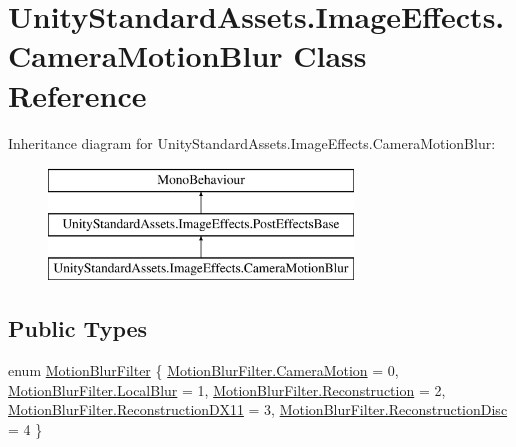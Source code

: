 \hypertarget{class_unity_standard_assets_1_1_image_effects_1_1_camera_motion_blur}{}\section{Unity\+Standard\+Assets.\+Image\+Effects.\+Camera\+Motion\+Blur Class Reference}
\label{class_unity_standard_assets_1_1_image_effects_1_1_camera_motion_blur}
Inheritance diagram for Unity\+Standard\+Assets.\+Image\+Effects.\+Camera\+Motion\+Blur\+:\begin{figure}[H]
\begin{center}
\leavevmode
\includegraphics[height=3.000000cm]{class_unity_standard_assets_1_1_image_effects_1_1_camera_motion_blur}
\end{center}
\end{figure}
\subsection*{Public Types}
\begin{DoxyCompactItemize}
\item 
enum \mbox{\hyperlink{class_unity_standard_assets_1_1_image_effects_1_1_camera_motion_blur_a5243e3d1f6a29d119409056d2e2ba99f}{Motion\+Blur\+Filter}} \{ \newline
\mbox{\hyperlink{class_unity_standard_assets_1_1_image_effects_1_1_camera_motion_blur_a5243e3d1f6a29d119409056d2e2ba99fa95432e27727c4639d8e6bf6867c26ac1}{Motion\+Blur\+Filter.\+Camera\+Motion}} = 0, 
\mbox{\hyperlink{class_unity_standard_assets_1_1_image_effects_1_1_camera_motion_blur_a5243e3d1f6a29d119409056d2e2ba99fae9d16d8aa9726c96bad1e609055db6b9}{Motion\+Blur\+Filter.\+Local\+Blur}} = 1, 
\mbox{\hyperlink{class_unity_standard_assets_1_1_image_effects_1_1_camera_motion_blur_a5243e3d1f6a29d119409056d2e2ba99fa2d4907781ee5dad928d4c2f39d4d4848}{Motion\+Blur\+Filter.\+Reconstruction}} = 2, 
\mbox{\hyperlink{class_unity_standard_assets_1_1_image_effects_1_1_camera_motion_blur_a5243e3d1f6a29d119409056d2e2ba99fa2e138ec188352208cc72692930aeff7f}{Motion\+Blur\+Filter.\+Reconstruction\+D\+X11}} = 3, 
\newline
\mbox{\hyperlink{class_unity_standard_assets_1_1_image_effects_1_1_camera_motion_blur_a5243e3d1f6a29d119409056d2e2ba99fa8748783bc6a0a1f7da0a1b57ce34061d}{Motion\+Blur\+Filter.\+Reconstruction\+Disc}} = 4
 \}
\end{DoxyCompactItemize}

